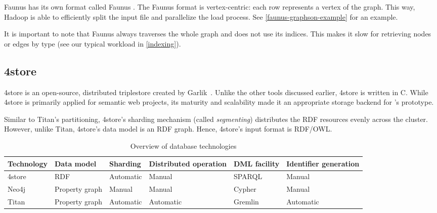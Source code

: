 Faunus has its own format called Faunus \graphson{}. The Faunus \graphson{} format is vertex-centric: each row represents a vertex of the graph. This way, Hadoop is able to efficiently split the input file and parallelize the load process. See \autoref{faunus-graphson-example} for an example.

It is important to note that Faunus always traverses the whole graph and does not use its indices. This makes it slow for retrieving nodes or edges by type (see our typical workload in \autoref{indexing}).

\subsection{4store}
\label{4store}

4store is an open-source, distributed triplestore created by Garlik~\cite{4store}. Unlike the other tools discussed earlier, 4store is written in C. While 4store is primarily applied for semantic web projects, its maturity and scalability made it an appropriate storage backend for \iqd{}'s prototype.

Similar to Titan's partitioning, 4store's sharding mechanism (called \emph{segmenting}) distributes the RDF resources evenly across the cluster. However, unlike Titan, 4store's data model is an RDF graph. Hence, 4store's input format is RDF/OWL.


\begin{table}[htb]

\centering
\begin{tabular}{ | l | l | l | m{2cm} | l | m{2cm} | }

\hline
\bf Technology & 
\bf Data model & 
\bf Sharding & 
\bf Distributed operation & 
\bf DML facility & 
\bf Identifier generation \tabularnewline \hline\hline
4store     & RDF            & Automatic & Manual                & SPARQL       & Manual                \\ \hline
Neo4j      & Property graph & Manual    & Manual                & Cypher       & Manual                \\ \hline
Titan      & Property graph & Automatic & Automatic             & Gremlin      & Automatic             \\ \hline

\end{tabular}
\caption{Overview of database technologies}
\label{tab:database-technologies}

\end{table}

